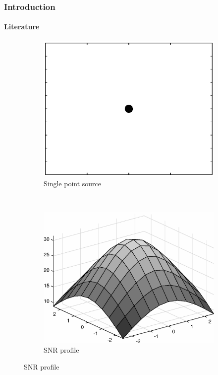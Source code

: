 \documentclass{beamer}
\theoremstyle{remark}
\begin{document}
\begin{frame}
\frametitle{Introduction}
\framesubtitle{Literature}
\begin{figure}[t!]
    \centering
    \begin{subfigure}[t]{0.4\columnwidth}
        \centering
        \includegraphics[width=\columnwidth]{point_source}
        \caption{Single point source}
\label{fig3:subfig1}        
    \end{subfigure}%
    ~ 
    \begin{subfigure}[t]{0.4\columnwidth}
        \centering
        \includegraphics[width=\columnwidth]{pointNoPowerDist_new}
        \caption{SNR profile}
\label{fig3:subfig2}
    \end{subfigure}
    \label{fig3}
  \end{figure}

\end{frame}
  
\end{document}
